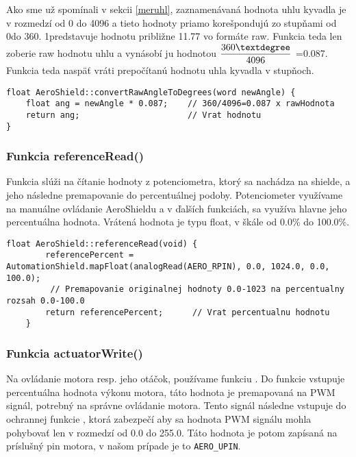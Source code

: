 Ako sme už spomínali v sekcii \ref{meruhl}, zaznamenávaná hodnota uhlu kyvadla je v rozmedzí od 0 do 4096 a tieto hodnoty priamo korešpondujú zo stupňami od 0\textdegree  do 360\textdegree. 1\textdegree  predstavuje hodnotu približne 11.77 vo formáte raw. Funkcia  teda len zoberie raw hodnotu uhlu a vynásobí ju hodnotou $\dfrac{360\textdegree}{4096}$ =0.087\textdegree. Funkcia teda naspäť vráti prepočítanú hodnotu uhla kyvadla v stupňoch. 

\begin{lstlisting}[caption={Zdrojový kód funkcie convertRawAngleToDegrees.},captionpos=b]
float AeroShield::convertRawAngleToDegrees(word newAngle) {  
	float ang = newAngle * 0.087;    // 360/4096=0.087 x rawHodnota                             
	return ang;                      // Vrat hodnotu
}
\end{lstlisting}


\subsubsection{Funkcia referenceRead()}

Funkcia  slúži na čítanie hodnoty z potenciometra, ktorý sa nachádza na shielde, a jeho následne premapovanie do percentuálnej podoby. Potenciometer využívame na manuálne ovládanie AeroShieldu a v ďalších funkciách, sa využíva hlavne jeho percentuálna hodnota. Vrátená hodnota je typu float, v škále od 0.0\% do 100.0\%. 

\begin{lstlisting}[caption={Zdrojový kód funkcie referenceRead.},captionpos=b]
	  float AeroShield::referenceRead(void) {      
		referencePercent = AutomationShield.mapFloat(analogRead(AERO_RPIN), 0.0, 1024.0, 0.0, 100.0);  
		 // Premapovanie originalnej hodnoty 0.0-1023 na percentualny rozsah 0.0-100.0
		return referencePercent;      // Vrat percentualnu hodnotu 
	}
\end{lstlisting}
	
\subsubsection{Funkcia actuatorWrite()}	
	
Na ovládanie motora resp. jeho otáčok, používame funkciu . Do funkcie vstupuje percentuálna hodnota výkonu motora, táto hodnota je premapovaná na PWM signál, potrebný na správne ovládanie motora. Tento signál následne vstupuje do ochrannej funkcie , ktorá zabezpečí aby sa hodnota PWM signálu mohla pohybovať len v rozmedzí od 0.0 do 255.0. Táto hodnota je potom zapísaná na príslušný pin motora, v našom prípade je to \verb|AERO_UPIN|. 
	

